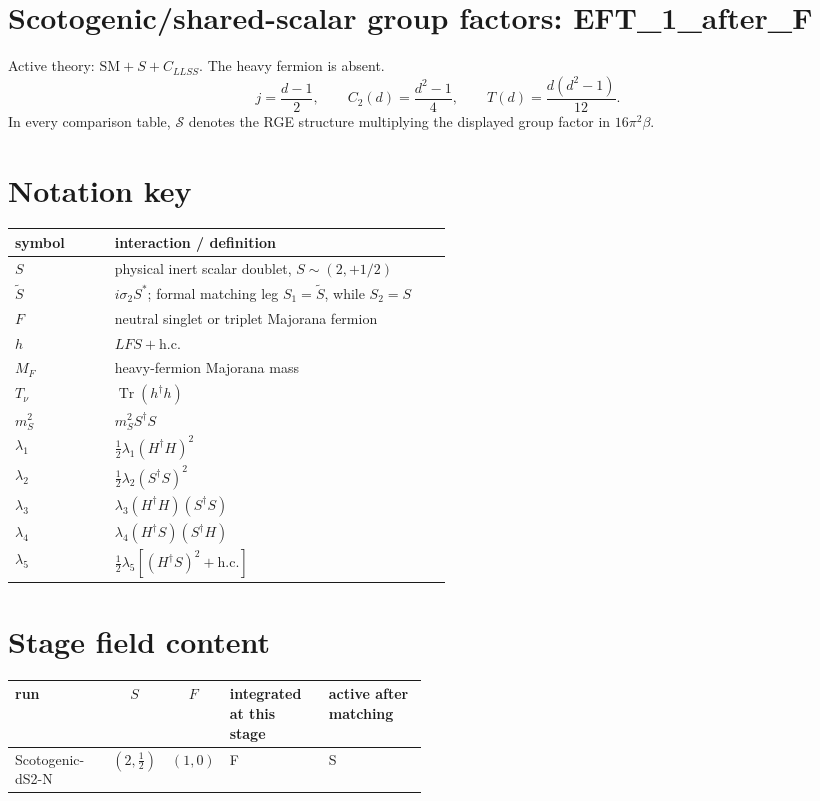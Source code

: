 \documentclass[9pt]{article}
\begin{document}
\section*{Scotogenic/shared-scalar group factors: EFT\_1\_after\_F}
Active theory: $\mathrm{SM}+S+C_{LLSS}$. The heavy fermion is absent.
\[j=\frac{d-1}{2},\qquad C_2(d)=\frac{d^2-1}{4},\qquad T(d)=\frac{d(d^2-1)}{12}.\]
In every comparison table, $\mathcal{S}$ denotes the RGE structure multiplying the displayed group factor in $16\pi^2\beta$.
\section*{Notation key}
\begin{longtable}{@{}p{0.21\linewidth}p{0.71\linewidth}@{}}
\toprule
symbol & interaction / definition \\
\midrule
$S$ & physical inert scalar doublet, $S\sim(2,+1/2)$ \\
$\widetilde S$ & $i\sigma_2S^*$; formal matching leg $S_1=\widetilde S$, while $S_2=S$ \\
$F$ & neutral singlet or triplet Majorana fermion \\
$h$ & $LFS+\mathrm{h.c.}$ \\
$M_F$ & heavy-fermion Majorana mass \\
$T_\nu$ & $\operatorname{Tr}(h^\dagger h)$ \\
$m_S^2$ & $m_S^2 S^\dagger S$ \\
$\lambda_1$ & $\frac12\lambda_1(H^\dagger H)^2$ \\
$\lambda_2$ & $\frac12\lambda_2(S^\dagger S)^2$ \\
$\lambda_3$ & $\lambda_3(H^\dagger H)(S^\dagger S)$ \\
$\lambda_4$ & $\lambda_4(H^\dagger S)(S^\dagger H)$ \\
$\lambda_5$ & $\frac12\lambda_5[(H^\dagger S)^2+\mathrm{h.c.}]$ \\
\bottomrule
\end{longtable}
\section*{Stage field content}
\begin{longtable}{@{}lcc p{0.24\linewidth}p{0.24\linewidth}@{}}
\toprule
run & $S$ & $F$ & integrated at this stage & active after matching \\
\midrule
Scotogenic-dS2-N & $(2,\frac{1}{2})$ & $(1,0)$ & F & S \\
\bottomrule
\end{longtable}
\end{document}
